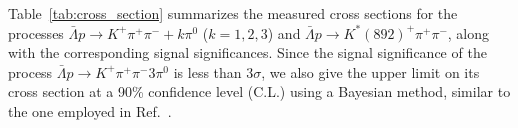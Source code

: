 \documentclass[prd,aps,reprint,noeprint,superscriptaddress,amsmath, amssymb]{revtex4-1}
\begin{document}
Table~\ref{tab:cross_section} summarizes the measured cross sections for the processes $\bar{\Lambda} p \to K^+\pi^+\pi^- + k\pi^0$ ($k=1,2,3$)
and $\bar{\Lambda} p \to  K^{*}(892)^{+}\pi^+\pi^-$, along with the corresponding signal significances.
Since the signal significance of the process $\bar{\Lambda} p \to K^+\pi^+\pi^-3\pi^0$ is less than $3\sigma$,
we also give the upper limit on its cross section at a 90\% confidence level (C.L.) using a Bayesian method, similar to the one employed in Ref.~\cite{BESIII:2024wvw}.

\begin{table}[htbp]
    \caption{The measured cross sections (or upper limit at 90\% C.L.) in mb.
    }
    \label{tab:cross_section}
    \setlength{\extrarowheight}{1.0ex}
     \renewcommand{\arraystretch}{1.0}
    \begin{center}
    \end{center}
\end{table}
\end{document}
